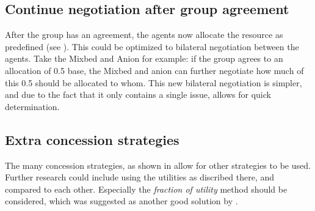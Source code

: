 \clearpage
\subsection{Continue negotiation after group agreement}
After the group has an agreement, the agents now allocate the resource as predefined (see ). This could be optimized to bilateral negotiation between the agents. Take the Mixbed and Anion for example: if the group agrees to an allocation of 0.5 base, the Mixbed and anion can further negotiate how much of this 0.5 should be allocated to whom. This new bilateral negotiation is simpler, and due to the fact that it only contains a single issue, allows for quick determination.

\subsection{Extra concession strategies}
The many concession strategies, as shown in  allow for other strategies to be used. Further research could include using the utilities as discribed there, and compared to each other. Especially the \textit{fraction of utility} method should be considered, which was suggested as another good solution by \citet{wu2009efficient}. 




\todos
\clearpage
\nocite{*}